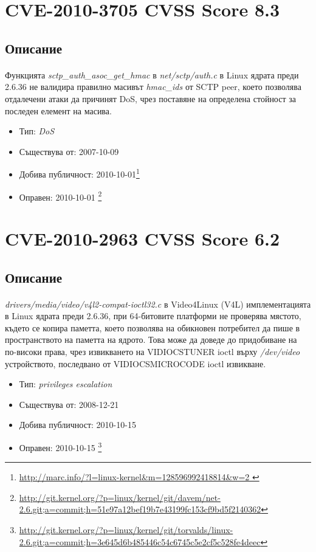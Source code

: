 \documentclass[a4paper,12pt,leqno]{article}
\begin{document}
\section{CVE-2010-3705 CVSS Score 8.3}
\subsection{Описание}
\paragraph{}
Функцията \textit{sctp\_auth\_asoc\_get\_hmac} в\textit{ net/sctp/auth.c} в Linux ядрата преди 2.6.36 не валидира правилно масивът \textit{hmac\_ids} от SCTP peer, което позволява отдалечени атаки да причинят DoS, чрез поставяне на определена стойност за последен елемент на масива.

\begin{itemize}
    \item Тип: \textit{DoS}
    \item Съществува от: 2007-10-09
  	\item Добива публичност: 2010-10-01\footnote{\url{http://marc.info/?l=linux-kernel&m=128596992418814&w=2	}}
    \item Оправен: 2010-10-01 \footnote{\url{http://git.kernel.org/?p=linux/kernel/git/davem/net-2.6.git;a=commit;h=51e97a12bef19b7e43199fc153cf9bd5f2140362}}
\end{itemize}


\section{CVE-2010-2963 CVSS Score 6.2}
\subsection{Описание}
\paragraph{}
\textit{drivers/media/video/v4l2-compat-ioctl32.c} в Video4Linux (V4L) имплементацията в Linux ядрата преди 2.6.36, при 64-битовите платформи не проверява мястото, където се копира паметта, което позволява на обикновен потребител да пише в пространството на паметта на ядрото. Това може да доведе до придобиване на по-високи права, чрез извикването на VIDIOCSTUNER ioctl върху \textit{/dev/video} устройството, последвано от VIDIOCSMICROCODE ioctl извикване.

\begin{itemize}
    \item Тип: \textit{privileges escalation}
    \item Съществува от: 2008-12-21
  	\item Добива публичност: 2010-10-15
    \item Оправен: 2010-10-15 \footnote{\url{http://git.kernel.org/?p=linux/kernel/git/torvalds/linux-2.6.git;a=commit;h=3e645d6b485446c54c6745c5e2cf5c528fe4deec}}
\end{itemize}
\end{document}
